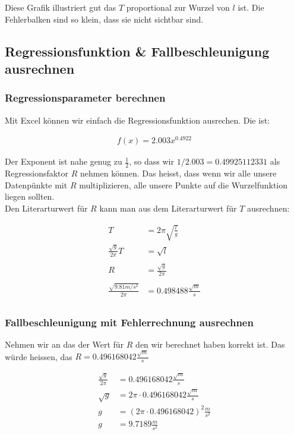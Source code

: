 \documentclass[12pt, a4paper, twoside]{article}
\begin{document}
Diese Grafik illustriert gut das $T$ proportional zur Wurzel von $l$ ist.
Die Fehlerbalken sind so klein, dass sie nicht sichtbar sind.

\subsection{Regressionsfunktion \& Fallbeschleunigung ausrechnen}
\subsubsection{Regressionsparameter berechnen}
Mit Excel können wir einfach die Regressionsfunktion ausrechen. Die ist:

\begin{align*}
  f(x) = 2.003x^{0.4922}
\end{align*}

Der Exponent ist nahe genug zu $\frac{1}{2}$, so dass wir $1/2.003 = 0.49925112331$ als Regressionsfaktor $R$ nehmen können. 
Das heisst, dass wenn wir alle unsere Datenpünkte mit $R$ multiplizieren, alle unsere Punkte auf die Wurzelfunktion liegen sollten. \\
Den Literarturwert für $R$ kann man aus dem Literarturwert für $T$ ausrechnen:

\begin{align*}
  T                             & = 2\pi \sqrt{\frac{l}{g}}    \\
  \frac{\sqrt{g}}{2\pi}T        & = \sqrt{l}                   \\
  \\
  R                             & = \frac{\sqrt{g}}{2\pi}      \\
  \\
  \frac{\sqrt{9.81m/s^2}}{2\pi} & = 0.498488\frac{\sqrt{m}}{s} \\
\end{align*}

\subsubsection{Fallbeschleunigung mit Fehlerrechnung ausrechnen}
Nehmen wir an das der Wert für $R$ den wir berechnet haben korrekt ist.
Das würde heissen, das $R = 0.496168042\frac{\sqrt{m}}{s}$

\begin{align*}
  \frac{\sqrt{g}}{2\pi} & = 0.496168042\frac{\sqrt{m}}{s}           \\
  \sqrt{g}              & = 2\pi\cdot 0.496168042\frac{\sqrt{m}}{s} \\
  g                     & = (2\pi\cdot0.496168042)^2\frac{m}{s^2}   \\
  g                     & = 9.7189\frac{m}{s^2}                     \\
\end{align*}
\end{document}
